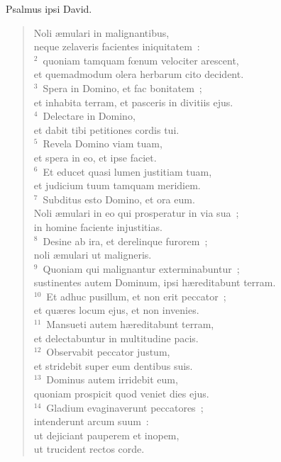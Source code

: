 \lettrine[lines=3,image=true,loversize=0.05,lraise=-0.03]{P}{}salmus ipsi David. \begin{flushleft}\begin{verse}\vspace{6pt}Noli \ae mulari in malignantibus,\\ neque zelaveris facientes iniquitatem~:\\
${}^{2}$~quoniam tamquam fœnum velociter arescent,\\ et quemadmodum olera herbarum cito decident.\\
${}^{3}$~Spera in Domino, et fac bonitatem~;\\ et inhabita terram, et pasceris in divitiis ejus.\\
${}^{4}$~Delectare in Domino,\\ et dabit tibi petitiones cordis tui.\\
${}^{5}$~Revela Domino viam tuam,\\ et spera in eo, et ipse faciet.\\
${}^{6}$~Et educet quasi lumen justitiam tuam,\\ et judicium tuum tamquam meridiem.\\
${}^{7}$~Subditus esto Domino, et ora eum.\\ Noli \ae mulari in eo qui prosperatur in via sua~;\\ in homine faciente injustitias.\\
${}^{8}$~Desine ab ira, et derelinque furorem~;\\ noli \ae mulari ut maligneris.\\
${}^{9}$~Quoniam qui malignantur exterminabuntur~;\\ sustinentes autem Dominum, ipsi h\ae reditabunt terram.\\
${}^{10}$~Et adhuc pusillum, et non erit peccator~;\\ et qu\ae res locum ejus, et non invenies.\\
${}^{11}$~Mansueti autem h\ae reditabunt terram,\\ et delectabuntur in multitudine pacis.\\
${}^{12}$~Observabit peccator justum,\\ et stridebit super eum dentibus suis.\\
${}^{13}$~Dominus autem irridebit eum,\\ quoniam prospicit quod veniet dies ejus.\\
${}^{14}$~Gladium evaginaverunt peccatores~;\\ intenderunt arcum suum~:\\ ut dejiciant pauperem et inopem,\\ ut trucident rectos corde.\\

\end{verse}
\end{flushleft}
